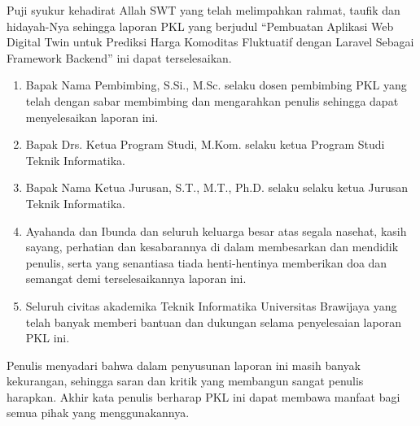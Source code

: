 \documentclass{pkl}
\begin{document}
\cover

\approvalpage

\approvalpagelapangan


\preface

Puji syukur kehadirat Allah SWT yang telah melimpahkan
rahmat, taufik dan hidayah-Nya sehingga laporan PKL yang berjudul
“Pembuatan Aplikasi Web Digital Twin untuk Prediksi Harga Komoditas
Fluktuatif dengan Laravel Sebagai Framework Backend” ini dapat terselesaikan.

\begin{enumerate}
\item{Bapak Nama Pembimbing, S.Si., M.Sc. selaku dosen pembimbing PKL
    yang telah dengan sabar membimbing dan mengarahkan penulis
    sehingga dapat menyelesaikan laporan ini.}
\item{Bapak Drs. Ketua Program Studi, M.Kom. selaku ketua Program
    Studi Teknik Informatika.}
\item{Bapak Nama Ketua Jurusan, S.T., M.T., Ph.D. selaku selaku ketua
    Jurusan Teknik Informatika.}
\item{Ayahanda dan Ibunda dan seluruh keluarga besar atas segala
    nasehat, kasih sayang, perhatian dan kesabarannya di dalam
    membesarkan dan mendidik penulis, serta yang senantiasa tiada
    henti-hentinya memberikan doa dan semangat demi terselesaikannya
    laporan ini.}
\item{Seluruh civitas akademika Teknik Informatika Universitas
    Brawijaya yang telah banyak memberi bantuan dan dukungan selama
    penyelesaian laporan PKL ini.}
\end{enumerate}

Penulis menyadari bahwa dalam penyusunan laporan ini masih banyak kekurangan,
sehingga saran dan kritik yang membangun sangat penulis harapkan. Akhir kata penulis
berharap PKL ini dapat membawa manfaat bagi semua pihak yang menggunakannya.
\end{document}

